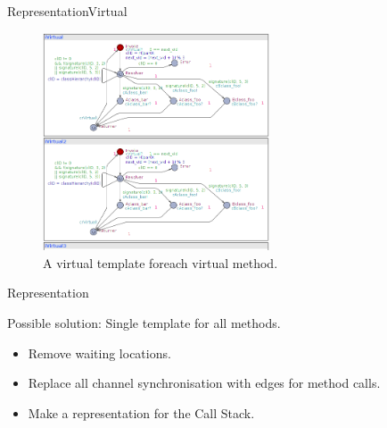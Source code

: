 \begin{frame}[fragile]{Representation}{Virtual}
\begin{figure}
\centering
\includegraphics[width=0.6\textwidth]{figures/newVirtual.png}
\caption{\footnotesize A virtual template foreach virtual method.}
\end{figure}
\end{frame}

\begin{frame}{Representation}{}
\begin{block}{Possible solution: Single template for all methods.}
\begin{itemize}
\item Remove waiting locations.
\item Replace all channel synchronisation with edges for method calls.
\item Make a representation for the Call Stack.
\end{itemize}

\end{block}
\end{frame}
